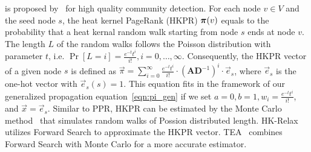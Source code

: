  is proposed by~\cite{chung2007HKPR} for high quality community detection. For each node $v\in V$ and the seed node $s$, the heat kernel PageRank (HKPR) $\bm{\pi}(v)$ equals to the probability that a heat kernal random walk starting from node $s$ ends at node $v$. The length  $L$ of the random walks follows the Poisson distribution with parameter $t$, i.e. $\Pr[L = i] = \frac{e^{-t}t^i}{i!}, i=0,\ldots, \infty$. Consequently, the HKPR vector of a given node $s$ is defined as $\vec{\pi}=\sum_{i=0}^\infty \frac{e^{-t}t^i}{i!}\cdot \left(\mathbf{A} \mathbf{D}^{-1}\right)^i\cdot \vec{e}_s$, 
where $\vec{e}_s$ is the one-hot vector with $\vec{e}_s(s)=1$.  
This equation fits in the framework of our generalized propagation equation~\eqref{eqn:pi_gen} if we set $a=0,b=1, w_i=\frac{e^{-t}t^i}{i!}$, and $\vec{x}=\vec{e}_s$. Similar to PPR, HKPR can be estimated by the Monte Carlo method~\cite{chung2018computing,yang2019TEA} that simulates random walks of Possion distributed length. HK-Relax~\cite{kloster2014heat} utilizes Forward Search to approximate the HKPR vector. TEA~\cite{yang2019TEA} combines Forward Search with  Monte Carlo for a more accurate estimator.

